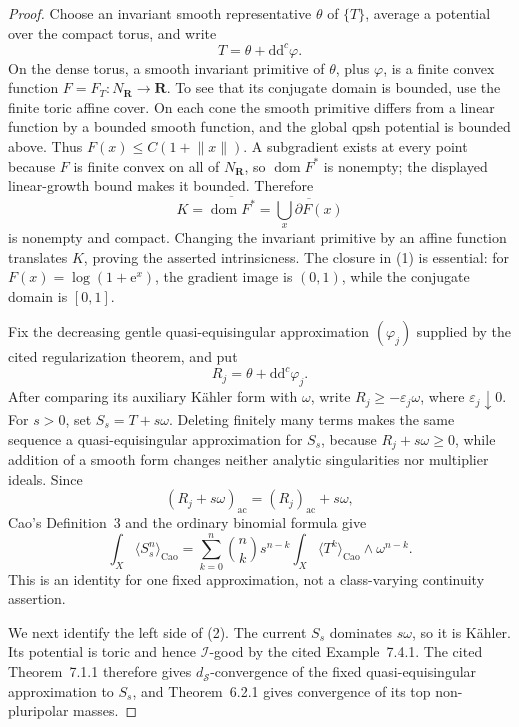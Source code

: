 \begin{proof}
Choose an invariant smooth representative \(\theta\) of \(\{T\}\), average
a potential over the compact torus, and write
\[
                       T=\theta+\mathrm d\mathrm d^c\varphi.
\]
On the dense torus, a smooth invariant primitive of \(\theta\), plus
\(\varphi\), is a finite convex function
\(F=F_T:N_{\mathbf R}\to\mathbf R\).  To see that its conjugate domain is
bounded, use the finite toric affine cover.  On each cone the smooth
primitive differs from a linear function by a bounded smooth function, and
the global qpsh potential is bounded above.  Thus
\(F(x)\leq C(1+\lVert x\rVert)\).  A subgradient exists at every point
because \(F\) is finite convex on all of \(N_{\mathbf R}\), so
\(\operatorname{dom}F^*\) is nonempty; the displayed linear-growth bound
makes it bounded.  Therefore
\[
 K=\overline{\operatorname{dom}F^*}
  =\overline{\bigcup_x\partial F(x)}
\tag{1}
\]
is nonempty and compact.  Changing the invariant primitive by an affine
function translates \(K\), proving the asserted intrinsicness.  The closure
in (1) is essential: for
\(F(x)=\log(1+\mathrm e^x)\), the gradient image is \((0,1)\), while the
conjugate domain is \([0,1]\).

Fix the decreasing gentle quasi-equisingular approximation
\((\varphi_j)\) supplied by the cited regularization theorem, and put
\[
                  R_j=\theta+\mathrm d\mathrm d^c\varphi_j.
\]
After comparing its auxiliary K\"ahler form with \(\omega\), write
\(R_j\geq-\varepsilon_j\omega\), where
\(\varepsilon_j\downarrow0\).  For \(s>0\), set
\(S_s=T+s\omega\).  Deleting finitely many terms makes the same sequence a
quasi-equisingular approximation for \(S_s\), because
\(R_j+s\omega\geq0\), while addition of a smooth form changes neither
analytic singularities nor multiplier ideals.  Since
\[
 (R_j+s\omega)_{\mathrm{ac}}=(R_j)_{\mathrm{ac}}+s\omega,
\]
Cao's Definition~3 and the ordinary binomial formula give
\[
 \int_X\langle S_s^n\rangle_{\mathrm{Cao}}
 =\sum_{k=0}^n\binom nk s^{n-k}
   \int_X\langle T^k\rangle_{\mathrm{Cao}}
                  \wedge\omega^{n-k}.
\tag{2}
\]
This is an identity for one fixed approximation, not a class-varying
continuity assertion.

We next identify the left side of (2).  The current \(S_s\) dominates
\(s\omega\), so it is K\"ahler.  Its potential is toric and hence
\(\mathcal I\)-good by the cited Example~7.4.1.  The cited Theorem~7.1.1
therefore gives \(d_{\mathcal S}\)-convergence of the fixed
quasi-equisingular approximation to \(S_s\), and Theorem~6.2.1 gives
convergence of its top non-pluripolar masses.


\end{proof}
